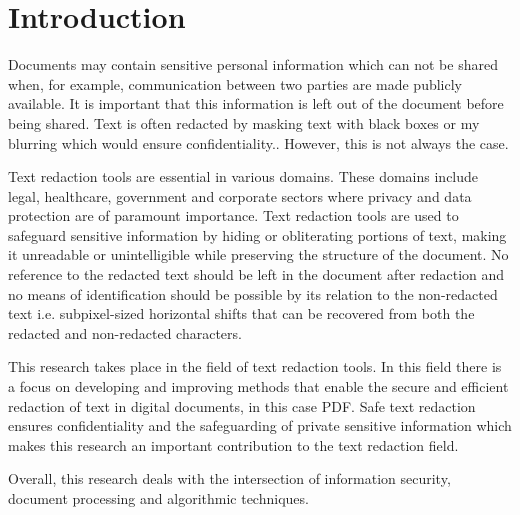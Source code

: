 \section{Introduction}
\label{sec:introduction}

Documents may contain sensitive personal information which can not be shared when, for example, communication between two parties are made publicly available. It is important that this information is left out of the document before being shared. Text is often redacted by masking text with black boxes or my blurring which would ensure confidentiality.. However, this is not always the case. 

Text redaction tools are essential in various domains. These domains include legal, healthcare, government and corporate sectors where privacy and data protection are of paramount importance. Text redaction tools are used to safeguard sensitive information by hiding or obliterating portions of text, making it unreadable or unintelligible while preserving the structure of the document. No reference to the redacted text should be left in the document after redaction and no means of identification should be possible by its relation to the non-redacted text i.e. subpixel-sized horizontal shifts that can be recovered from both the redacted and non-redacted characters. 

This research takes place in the field of text redaction tools. In this field there is a focus on developing and improving methods that enable the secure and efficient redaction of text in digital documents, in this case PDF. Safe text redaction ensures confidentiality and the safeguarding of private sensitive information which makes this research an important contribution to the text redaction field. 

Overall, this research deals with the intersection of information security, document processing and algorithmic techniques.